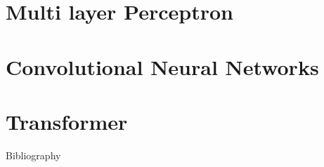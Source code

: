 \documentclass[pressentation,10pt,aspectratio=169,xcolor=table, colorlinks=true]{beamer}
\begin{document}
\section{Multi layer Perceptron}

\section{Convolutional Neural Networks}

\section{Transformer}



\begin{frame}[fragile,allowframebreaks,label=]{Bibliography}
\printbibliography
\end{frame}

\begin{frame}[label={sec:orgc74e2e4},noframenumbering]{}
\begin{center}
\small
\doclicenseLongText

\doclicenseImage
\end{center}
\end{frame}
\end{document}
